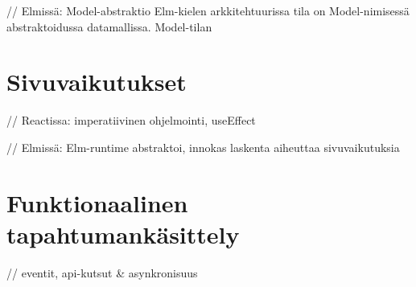 // Elmissä: Model-abstraktio
Elm-kielen arkkitehtuurissa tila on Model-nimisessä abstraktoidussa datamallissa. Model-tilan 


\section{Sivuvaikutukset}

// Reactissa: imperatiivinen ohjelmointi, useEffect

// Elmissä: Elm-runtime abstraktoi, innokas laskenta aiheuttaa sivuvaikutuksia

\section{Funktionaalinen tapahtumankäsittely}

// eventit, api-kutsut \& asynkronisuus
